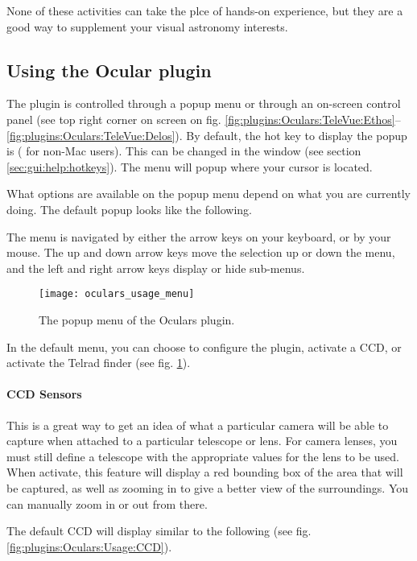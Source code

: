 None of these activities can take the plce of hands-on experience, but they are a good way to supplement your visual astronomy interests.

\subsection{Using the Ocular plugin}
\label{sec:sec:plugins:Oculars:UsingPlugin}

The plugin is controlled through a popup menu or through an on-screen control panel (see top right corner on screen on fig. \ref{fig:plugins:Oculars:TeleVue:Ethos}--\ref{fig:plugins:Oculars:TeleVue:Delos}). By default, the hot key to display the popup is  ( for non-Mac users). This can be changed in the  window (see section \ref{sec:gui:help:hotkeys}). The menu will popup where your cursor is located.

What options are available on the popup menu depend on what you are currently doing. The default popup looks like the following.

The menu is navigated by either the arrow keys on your keyboard, or by your mouse. The up and down arrow keys move the selection up or down the menu, and the left and right arrow keys display or hide sub-menus. 

\begin{figure}[ht]\centering
\texttt{[image: oculars\_usage\_menu]}
\caption{The popup menu of the Oculars plugin.}
\label{fig:plugins:Oculars:Usage:Menu}
\end{figure}

In the default menu, you can choose to configure the plugin, activate a CCD, or activate the Telrad finder (see fig. \ref{fig:plugins:Oculars:Usage:Menu}).

\paragraph{CCD Sensors}
This is a great way to get an idea of what a particular camera will be able to capture when attached to a particular telescope or lens. For camera lenses, you must still define a telescope with the appropriate values for the lens to be used. When activate, this feature will display a red bounding box of the area that will be captured, as well as zooming in to give a better view of the surroundings. You can manually zoom in or out from there.

The default CCD will display similar to the following (see fig. \ref{fig:plugins:Oculars:Usage:CCD}).

